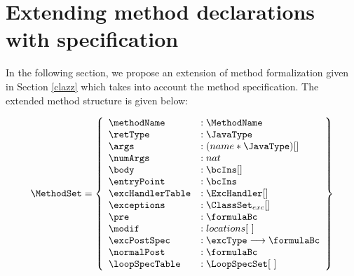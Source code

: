 \section{Extending method declarations with specification}\label{methExtend}

In the following section, we propose an extension of method formalization given in Section \ref{clazz} which takes into account
the method specification. The extended method structure is given below:

$$ \begin{array}{l} %
                     \MethodSet  = \left\{\begin{array}{ll}  
                                                          \methodName & :\MethodName\\
						          \retType & :\JavaType\\
							  \args &  : (name * \JavaType) [] \\
							  \numArgs & : nat \\
							  \body &  : \bcIns [] \\
							  \entryPoint  &  : \bcIns \\
							  \excHandlerTable & : \ExcHandler [] \\
							  \exceptions &  : \ClassSet_{exc}[] \\
							  \pre & : \formulaBc \\
							  \modif & : locations\lbrack \ \rbrack  \\
							  \excPostSpec & : \excType \longrightarrow \formulaBc \\
							  \normalPost & : \formulaBc \\
                                                          \loopSpecTable & : \LoopSpecSet \lbrack \ \rbrack  
							  
                                     \end{array}  \right\} 
     \end{array} $$

